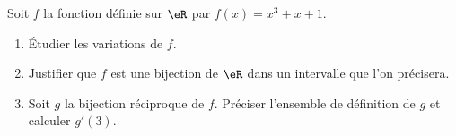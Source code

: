 
\begin{exercice}\label{exoautoanalyseCTU-2}





Soit $f$ la fonction définie sur $\eR$ par $f(x)=x^3+x+1$.
\begin{enumerate}
\item Étudier les variations de $f$.
\item Justifier que $f$ est une bijection de  $\eR$ dans un intervalle que l'on précisera. 
\item Soit $g$ la bijection réciproque de $f$. Préciser l'ensemble de définition de $g$ et calculer $g'(3)$.
\end{enumerate}




\end{exercice}
